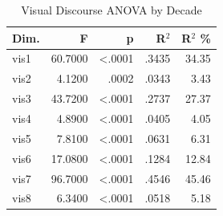 \begin{table}
\caption{Visual Discourse ANOVA by Decade}
\label{tab:visual_anova}
\begin{tabular}{lrrrr}
\toprule
Dim. & F & p & R$^2$ & R$^2$ \% \\
\midrule
vis1 & 60.7000 & <.0001 & .3435 & 34.35 \\
vis2 & 4.1200 & .0002 & .0343 & 3.43 \\
vis3 & 43.7200 & <.0001 & .2737 & 27.37 \\
vis4 & 4.8900 & <.0001 & .0405 & 4.05 \\
vis5 & 7.8100 & <.0001 & .0631 & 6.31 \\
vis6 & 17.0800 & <.0001 & .1284 & 12.84 \\
vis7 & 96.7000 & <.0001 & .4546 & 45.46 \\
vis8 & 6.3400 & <.0001 & .0518 & 5.18 \\
\bottomrule
\end{tabular}
\end{table}
